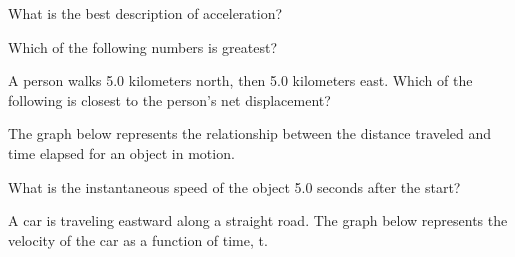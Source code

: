 \documentclass[10pt]{examdesign}
\begin{document}
\begin{multiplechoice} [title={Multiple Choice},
	rearrange=yes]
\begin{question}
	What is the best description of acceleration?
\end{question}

\begin{question}
	Which of the following numbers is greatest?
	
\end{question}


\begin{question}
A person walks 5.0 kilometers north, then 5.0 kilometers east. Which of the following is closest to the person's net displacement?
\end{question}

\begin{question}

The graph below represents the relationship between the distance traveled and time elapsed for an object in motion.  


What is the instantaneous speed of the object 5.0 seconds after the start?


	\end{question}

\begin{question}
A car is traveling eastward along a straight road. The graph below represents the velocity of the car as a function of time, t.


\end{question}
\end{multiplechoice}
\end{document}
